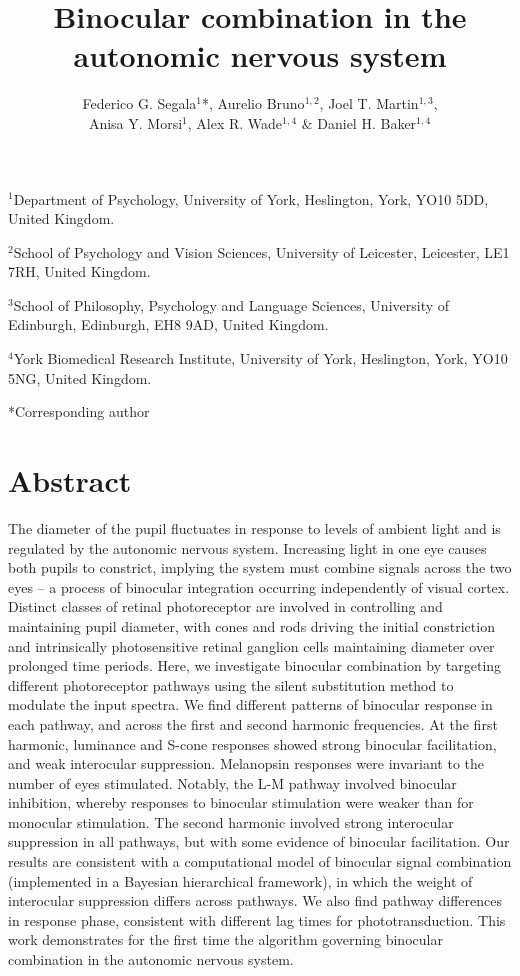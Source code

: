 \documentclass[
]{article}
\title{Binocular combination in the autonomic nervous system}
\author{Federico G. Segala\(^1\)*, Aurelio Bruno\(^{1,2}\), Joel T. Martin\(^{1,3}\),\\
Anisa Y. Morsi\(^1\), Alex R. Wade\(^{1,4}\) \& Daniel H. Baker\(^{1,4}\)}
\date{}
\begin{document}
\maketitle

\(^1\)Department of Psychology, University of York, Heslington, York, YO10 5DD, United Kingdom.

\(^2\)School of Psychology and Vision Sciences, University of Leicester, Leicester, LE1 7RH, United Kingdom.

\(^3\)School of Philosophy, Psychology and Language Sciences, University of Edinburgh, Edinburgh, EH8 9AD, United Kingdom.

\(^4\)York Biomedical Research Institute, University of York, Heslington, York, YO10 5NG, United Kingdom.

*Corresponding author

\hypertarget{abstract}{%
\section{Abstract}\label{abstract}}

The diameter of the pupil fluctuates in response to levels of ambient light and is regulated by the autonomic nervous system. Increasing light in one eye causes both pupils to constrict, implying the system must combine signals across the two eyes -- a process of binocular integration occurring independently of visual cortex. Distinct classes of retinal photoreceptor are involved in controlling and maintaining pupil diameter, with cones and rods driving the initial constriction and intrinsically photosensitive retinal ganglion cells maintaining diameter over prolonged time periods. Here, we investigate binocular combination by targeting different photoreceptor pathways using the silent substitution method to modulate the input spectra. We find different patterns of binocular response in each pathway, and across the first and second harmonic frequencies. At the first harmonic, luminance and S-cone responses showed strong binocular facilitation, and weak interocular suppression. Melanopsin responses were invariant to the number of eyes stimulated. Notably, the L-M pathway involved binocular inhibition, whereby responses to binocular stimulation were weaker than for monocular stimulation. The second harmonic involved strong interocular suppression in all pathways, but with some evidence of binocular facilitation. Our results are consistent with a computational model of binocular signal combination (implemented in a Bayesian hierarchical framework), in which the weight of interocular suppression differs across pathways. We also find pathway differences in response phase, consistent with different lag times for phototransduction. This work demonstrates for the first time the algorithm governing binocular combination in the autonomic nervous system.
\end{document}
